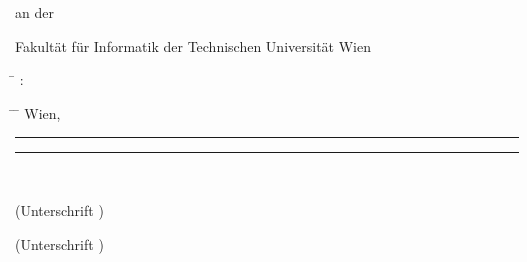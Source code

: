 \begin{center}
\begin{minipage}[t][1.7cm][t]{\textwidth}%
  \vspace{0pt}\raggedright\thesistitlefontnormalsize\sffamily
  an der

  Fakult\"{a}t f\"{u}r Informatik der Technischen Universit\"{a}t Wien
\end{minipage}

\begin{minipage}[t][3cm][t]{\textwidth}%
  \vspace{0pt}\raggedright\thesistitlefontnormalsize\sffamily
  \begin{tabbing}%
	    \hspace{19mm} \= \hspace{66mm} \kill
	    \tuinfthesisbetreuung: \> \tuinfthesisbetreins\\
  \end{tabbing}
\end{minipage}

\begin{minipage}[t][2cm][t]{\textwidth}%
  \vspace{0pt}\sffamily\thesistitlefontnormalsize
  \begin{tabbing}%
    \hspace{42mm} \= \hspace{66mm} \= \hspace{51mm} \kill
    Wien, \tuinfthesisdate \> {\raggedright\rule{51mm}{0.5pt}} \> {\raggedright\rule{51mm}{0.5pt}} \\
    \> \begin{minipage}[t][0.5cm][t]{51mm}\centering (Unterschrift \tuinfthesisverfassung)\end{minipage}
    \> \begin{minipage}[t][0.5cm][t]{51mm}\centering (Unterschrift \tuinfthesisbetreuung)\end{minipage}
    \end{tabbing}
\end{minipage}

\end{center}

\cleardoublepage


\setlength{\baselineskip}{\tmpbaselineskip}
\setlength{\parindent}{\tmpparindent}

\restoregeometry


